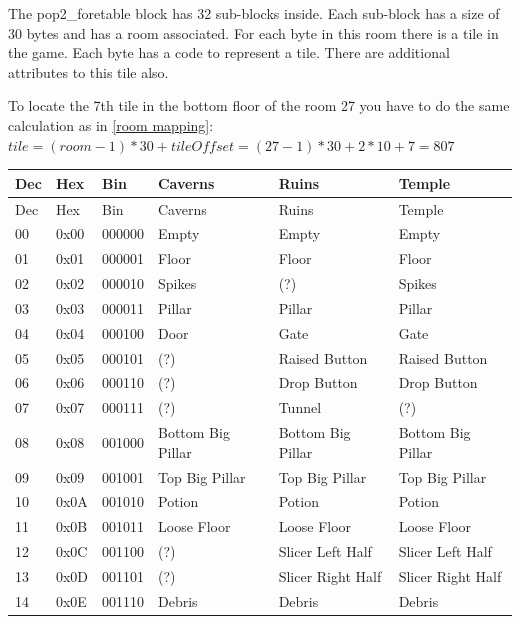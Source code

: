 \documentclass{article}
\begin{document}
 The pop2\_foretable block has 32 sub-blocks inside. Each sub-block has a
 size of 30 bytes and has a room associated. For each byte in this room
 there is a tile in the game. Each byte has a code to represent a tile.
 There are additional attributes to this tile also.
 
 To locate the 7th tile in the bottom floor of the room 27 you have to do
 the same calculation as in \ref{room mapping}:
  $tile=(room-1)*30+tileOffset=(27-1)*30+2*10+7=807$
 

\renewcommand{\tabcolsep}{0.2em}
\begin{longtable}{llllll}
  \hline
 Dec& Hex  & Bin    & Caverns            & Ruins             & Temple \\
  \hline
 \endfirsthead
  \hline
 Dec& Hex  & Bin    & Caverns            & Ruins             & Temple \\
  \hline
 \endhead
 00 & 0x00 & 000000 & Empty              & Empty             & Empty \\
 01 & 0x01 & 000001 & Floor              & Floor             & Floor \\
 02 & 0x02 & 000010 & Spikes             & (?)               & Spikes \\
 03 & 0x03 & 000011 & Pillar             & Pillar            & Pillar \\
 04 & 0x04 & 000100 & Door               & Gate              & Gate \\
 05 & 0x05 & 000101 & (?)                & Raised Button     & Raised Button \\
 06 & 0x06 & 000110 & (?)                & Drop Button       & Drop Button \\
 07 & 0x07 & 000111 & (?)                & Tunnel            & (?) \\
 08 & 0x08 & 001000 & Bottom Big Pillar  & Bottom Big Pillar & Bottom Big Pillar \\
 09 & 0x09 & 001001 & Top Big Pillar     & Top Big Pillar    & Top Big Pillar \\
 10 & 0x0A & 001010 & Potion             & Potion            & Potion \\
 11 & 0x0B & 001011 & Loose Floor        & Loose Floor       & Loose Floor \\
 12 & 0x0C & 001100 & (?)                & Slicer Left Half  & Slicer Left Half \\
 13 & 0x0D & 001101 & (?)                & Slicer Right Half & Slicer Right Half \\
 14 & 0x0E & 001110 & Debris             & Debris            & Debris \\

\end{longtable}
\end{document}
